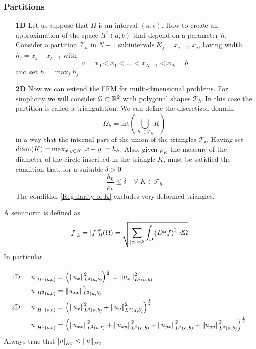\subsubsection*{Partitions}
\begin{itemize}
    \item[\textbf{1D}]
    Let us suppose that \(\Omega\) is an interval \((a,b)\). How to create an approximation of the space \(H^1(a,b)\) that depend on a parameter \(h\). Consider a partition \(\mathcal{T}_h\) in \(N+1\) subintervals \(K_j = x_{j-1}, x_j\), having width \(h_j = x_j - x_{j-1}\) with 
    \begin{equation}
        a = x_0 < x_1 < \ldots < x_{N-1} < x_N = b \label{Partition of an interval}
    \end{equation}
    and set \(h = \max_j h_j\). 
    \item[\textbf{2D}] Now we can extend the FEM for multi-dimensional problems. For simplicity we will consider \(\Omega \subset \mathbb{R}^2\) with polygonal shapes \(\mathcal{T}_h\). In this case the partition is called a triangulation. We can define the discretized domain 
    \[
        \Omega_h = \text{int}\left(\bigcup_{K \in \mathcal{T}_h} K\right)
    \]
    in a way that the internal part of the union of the triangles \(\mathcal{T}_h\). Having set \(\text{diam}(K) = \max_{x,y \in K} \abs{x-y} = h_k\). Also, given \(\rho_K\) the measure of the diameter of the circle inscribed in the triangle \(K\), must be satisfied the condition that, for a suitable \(\delta > 0\) 
    \begin{equation}
        \frac{h_k}{\rho_k} \leq \delta \quad \forall \; K \in \mathcal{T}_h \label{Regularity of K}
    \end{equation}
    The condition \eqref{Regularity of K} excludes very deformed triangles.

\end{itemize}

\begin{definition}[Seminorms]
    A seminorm is defined as 
    \[
        \abs{f}_k = \abs{f}_H^k (\Omega) = \sqrt{\sum_{\abs{\alpha} = k} \int_\Omega \left(D^\alpha f\right)^2 \, d\Omega}
    \]
    In particular 

        \begin{align*}
            \text{1D:}\quad  \abs{u}_{H^1(a,b)} & = \left(\norm{u_x}^2_{L^2(a,b)}\right)^{\frac{1}{2}} = \norm{u_x}^2_{L^2(a,b)} \\
              \abs{u}_{H^2(a,b)} & = \norm{u_{xx}}^2_{L^2(a,b)} \\
            \text{2D:}\quad  \abs{u}_{H^1(a,b)} & = \left(\norm{u_x}^2_{L^2(a,b)} + \norm{u_y}^2_{L^2(a,b)}\right)^{\frac{1}{2}} \\
             \abs{u}_{H^1(a,b)} & = \left(\norm{u_{xx}}^2_{L^2(a,b)} + \norm{u_{xy}}^2_{L^2(a,b)} + \norm{u_{yx}}^2_{L^2(a,b)} +\norm{u_{yy}}^2_{L^2(a,b)}\right)^{\frac{1}{2}} \\
        \end{align*}
    Always true that \(\abs{u}_{H^q} \leq \norm{u}_{H^q}\)
\end{definition}

